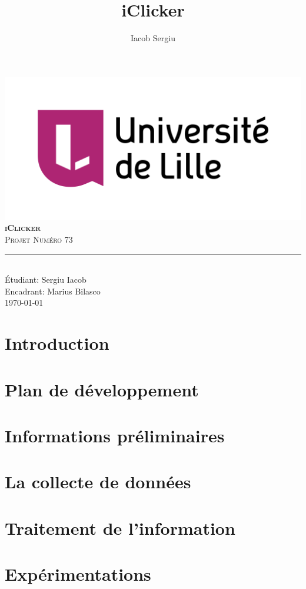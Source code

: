 \documentclass[11pt,titlepage]{report}
\author{Iacob Sergiu}
\title{iClicker}
\begin{document}
\begin{titlepage}
    \centering
    \includegraphics[width=0.75\linewidth]{universite_de_lille.png}\\[0.25cm]
    \vspace{\fill}
    \textbf{\textsc{\fontsize{50}{50}\selectfont iClicker}}\\ \vspace{\fill}		
	\textsc{\LARGE Projet Numéro 73}\\[0.4cm]
    \rule{\linewidth}{0.2 mm}\\[0.5 cm]
    Étudiant: Sergiu Iacob
    \\
    Encadrant: Marius Bilasco
    \\
    \vspace{\fill}
    \monthyeardate\today
\end{titlepage}
\restoregeometry

{\pagestyle{plain}
\tableofcontents
\cleardoublepage}

\chapter{Introduction}


\chapter{Plan de développement}


\chapter{Informations préliminaires}


\chapter{La collecte de données}


\chapter{Traitement de l'information}


\chapter{Expérimentations}


% 

\clearpage
\pagestyle{numberonly}

\printbibliography
\end{document}

